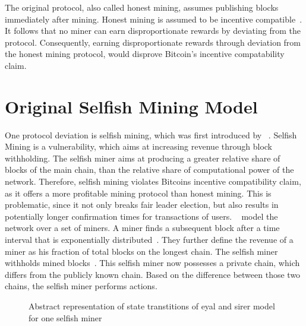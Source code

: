 The original protocol, also called honest mining, assumes publishing blocks immediately after mining. Honest mining is assumed to be incentive compatible~\cite{1}. It follows that no miner can earn disproportionate rewards by deviating from the protocol.
Consequently, earning disproportionate rewards through deviation from the honest mining protocol, would disprove Bitcoin's incentive compatability claim.

\section{Original Selfish Mining Model}\label{eyalmodel}
One protocol deviation is selfish mining, which was first introduced by \citeauthor{eyal}~\cite{eyal}.
Selfish Mining is a vulnerability, which aims at increasing revenue through block withholding. The selfish miner aims at producing a greater relative share of blocks of the main chain, than the relative share of computational power of the network. Therefore, selfish mining violates Bitcoins incentive compatibility claim, as it offers a more profitable mining protocol than honest mining. This is problematic, since it not only breaks fair leader election, but also results in potentially longer confirmation times for transactions of users.
~\citeauthor{eyal} model the network over a set of miners. A miner finds a subsequent block after a time interval that is exponentially distributed~\cite{eyal}. They further define the revenue of a miner as his fraction of total blocks on the longest chain.
The selfish miner withholds mined blocks~\cite{eyal}. This selfish miner now possesses a private chain, which differs from the publicly known chain. Based on the difference between those two chains, the selfish miner performs actions. 
\begin{figure}
\begin{center}
\end{center}
   \caption{Abstract representation of state transtitions of eyal and sirer model for one selfish miner}
\label{fig:eyal_model}

\end{figure}
